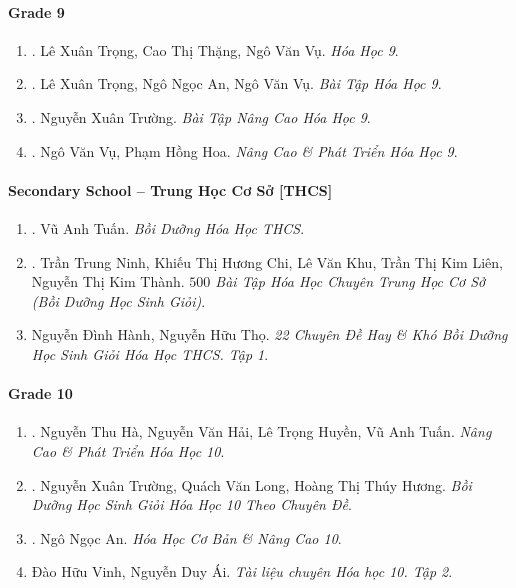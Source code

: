 \documentclass{article}
\begin{document}
\paragraph{Grade 9}

\begin{enumerate}
	\item \cite{SGK_Hoa_Hoc_9}. Lê Xuân Trọng, Cao Thị Thặng, Ngô Văn Vụ. {\it Hóa Học 9}.\hfill{\sf[reading]}

	\item \cite{SBT_Hoa_Hoc_9}. Lê Xuân Trọng, Ngô Ngọc An, Ngô Văn Vụ. {\it Bài Tập Hóa Học 9}.\hfill{\sf[reading]}

	\item \cite{Truong_BTNC_Hoa_Hoc_9_2021}. Nguyễn Xuân Trường. {\it Bài Tập Nâng Cao Hóa Học 9}.\hfill{\sf[reading]}

	\item \cite{Vu_Hoa2021}. Ngô Văn Vụ, Phạm Hồng Hoa. {\it Nâng Cao \& Phát Triển Hóa Học 9}.\hfill{\sf[reading]}
\end{enumerate}

\paragraph{Secondary School -- Trung Học Cơ Sở [THCS]}

\begin{enumerate}
	\item \cite{Tuan2022}. Vũ Anh Tuấn. {\it Bồi Dưỡng Hóa Học THCS}.\hfill{\sf[reading]}

	\item \cite{Ninh_Chi_Khu_Lien_Thanh2019}. Trần Trung Ninh, Khiếu Thị Hương Chi, Lê Văn Khu, Trần Thị Kim Liên, Nguyễn Thị Kim Thành. {\it $500$ Bài Tập Hóa Học Chuyên Trung Học Cơ Sở (Bồi Dưỡng Học Sinh Giỏi)}.\hfill{\sf[reading]}

	\item Nguyễn Đình Hành, Nguyễn Hữu Thọ. {\it 22 Chuyên Đề Hay \& Khó Bồi Dưỡng Học Sinh Giỏi Hóa Học THCS. Tập 1}.
\end{enumerate}

\paragraph{Grade 10}

\begin{enumerate}
	\item \cite{Ha_Hai_Huyen_Tuan2022}. Nguyễn Thu Hà, Nguyễn Văn Hải, Lê Trọng Huyền, Vũ Anh Tuấn. {\it Nâng Cao \& Phát Triển Hóa Học 10}.\hfill{\sf[reading]}

	\item \cite{Truong_Long_Huong_bdhsg_Hoa_Hoc_10}. Nguyễn Xuân Trường, Quách Văn Long, Hoàng Thị Thúy Hương. {\it Bồi Dưỡng Học Sinh Giỏi Hóa Học 10 Theo Chuyên Đề}.\hfill{\sf[reading]}
	\item \cite{An_Hoa_Hoc_co_ban_nang_cao_10}. Ngô Ngọc An. {\it Hóa Học Cơ Bản \& Nâng Cao 10}.\hfill{\sf[reading]}

	\item Đào Hữu Vinh, Nguyễn Duy Ái. {\it Tài liệu chuyên Hóa học 10. Tập 2}.\hfill{\sf[reading]}
\end{enumerate}
\end{document}
